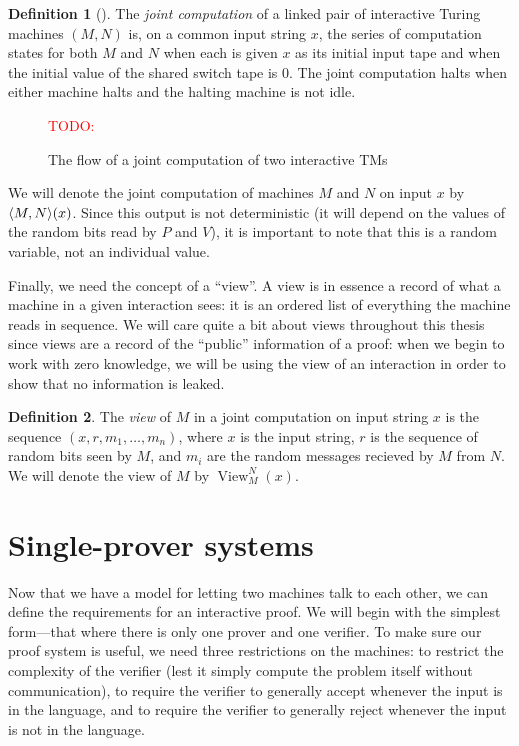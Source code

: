 \documentclass[english,12pt]{reedthesis}
\theoremstyle{plain}
\theoremstyle{definition}
\newtheorem{defn}[defn]{Definition}
\theoremstyle{remark}
\DeclareMathOperator{\View}{View}
\DeclarePairedDelimiter{\ang}{\langle}{\rangle}
\newcommand{\TODO}[1]{\textcolor{red}{TODO: #1}}
\begin{document}
\begin{defn}[{\cite[Def.\ 4.2.2]{Go01}}]\label{def:joint-comp}
  The \emph{joint computation} of a linked pair of interactive Turing machines
  $(M, N)$ is, on a common input string $x$, the series of computation states
  for both $M$ and $N$ when each is given $x$ as its initial input tape and when
  the initial value of the shared switch tape is $0$. The joint computation
  halts when either machine halts and the halting machine is not idle.
\end{defn}

\begin{figure}
  \TODO{}
  \caption{The flow of a joint computation of two interactive
    TMs}\label{fig:joint-comp-flow}
\end{figure}

We will denote the joint computation of machines $M$ and $N$ on input $x$ by
$\ang{M, N}(x)$. Since this output is not deterministic (it will depend on the
values of the random bits read by $P$ and $V$), it is important to note that
this is a random variable, not an individual value.

Finally, we need the concept of a ``view''. A view is in essence a record of
what a machine in a given interaction sees: it is an ordered list of everything
the machine reads in sequence. We will care quite a bit about views throughout
this thesis since views are a record of the ``public'' information of a proof:
when we begin to work with zero knowledge, we will be using the view of an
interaction in order to show that no information is leaked.

\begin{defn}\label{def:view}
  The \emph{view} of $M$ in a joint computation on input string $x$ is the
  sequence $(x, r, m_{1}, \ldots, m_{n})$, where $x$ is the input string, $r$ is the
  sequence of random bits seen by $M$, and $m_{i}$ are the random messages
  recieved by $M$ from $N$. We will denote the view of $M$ by
  $\View_{M}^{N}(x)$.
\end{defn}

\section{Single-prover systems}\label{sec:single-prover}

Now that we have a model for letting two machines talk to each other, we can
define the requirements for an interactive proof. We will begin with the
simplest form---that where there is only one prover and one verifier. To make sure
our proof system is useful, we need three restrictions on the machines: to
restrict the complexity of the verifier (lest it simply compute the problem
itself without communication), to require the verifier to generally accept
whenever the input is in the language, and to require the verifier to generally
reject whenever the input is not in the language.
\end{document}
